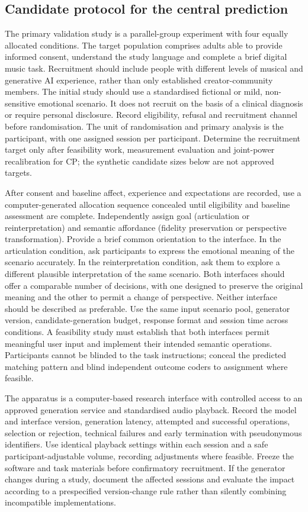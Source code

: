 \documentclass[11pt,a4paper]{article}
\begin{document}
\subsection{Candidate protocol for the central prediction}
The primary validation study is a parallel-group experiment with four equally allocated conditions. The target population comprises adults able to provide informed consent, understand the study language and complete a brief digital music task. Recruitment should include people with different levels of musical and generative AI experience, rather than only established creator-community members. The initial study should use a standardised fictional or mild, non-sensitive emotional scenario. It does not recruit on the basis of a clinical diagnosis or require personal disclosure. Record eligibility, refusal and recruitment channel before randomisation. The unit of randomisation and primary analysis is the participant, with one assigned session per participant. Determine the recruitment target only after feasibility work, measurement evaluation and joint-power recalibration for CP; the synthetic candidate sizes below are not approved targets.

After consent and baseline affect, experience and expectations are recorded, use a computer-generated allocation sequence concealed until eligibility and baseline assessment are complete. Independently assign goal (articulation or reinterpretation) and semantic affordance (fidelity preservation or perspective transformation). Provide a brief common orientation to the interface. In the articulation condition, ask participants to express the emotional meaning of the scenario accurately. In the reinterpretation condition, ask them to explore a different plausible interpretation of the same scenario. Both interfaces should offer a comparable number of decisions, with one designed to preserve the original meaning and the other to permit a change of perspective. Neither interface should be described as preferable. Use the same input scenario pool, generator version, candidate-generation budget, response format and session time across conditions. A feasibility study must establish that both interfaces permit meaningful user input and implement their intended semantic operations. Participants cannot be blinded to the task instructions; conceal the predicted matching pattern and blind independent outcome coders to assignment where feasible.

The apparatus is a computer-based research interface with controlled access to an approved generation service and standardised audio playback. Record the model and interface version, generation latency, attempted and successful operations, selection or rejection, technical failures and early termination with pseudonymous identifiers. Use identical playback settings within each session and a safe participant-adjustable volume, recording adjustments where feasible. Freeze the software and task materials before confirmatory recruitment. If the generator changes during a study, document the affected sessions and evaluate the impact according to a prespecified version-change rule rather than silently combining incompatible implementations.
\end{document}
